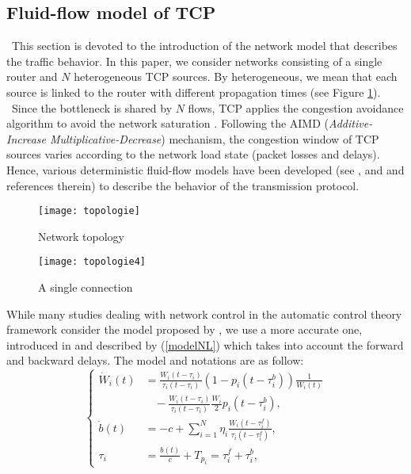 \documentclass[a4paper, 10pt, onecolumn]{article}
\begin{document}
\subsection{Fluid-flow model of TCP}
~\indent  This section is devoted to the introduction of the network model that describes the traffic behavior. In this paper, we consider networks consisting of a single router and $N$ heterogeneous TCP sources. By heterogeneous, we mean that each source is linked to the router with different propagation times (see Figure \ref{topologie}).\\
~\indent Since the bottleneck is shared by $N$ flows, TCP applies the congestion avoidance algorithm to avoid the network saturation \cite{Jac88}. Following the AIMD ({\it Additive-Increase Multiplicative-Decrease}) mechanism, the congestion window of TCP sources varies according to the network load state (packet losses and delays). Hence, various deterministic fluid-flow models have been developed (see \cite{Low02}, \cite{Mis00} and \cite{Sri04} and references therein) to describe the behavior of the transmission protocol.
\begin{figure}
\centerline{\texttt{[image: topologie]}}
       \caption{Network topology}
       \label{topologie}
       \end{figure}
\begin{figure}
        \centerline{\texttt{[image: topologie4]}}
       \caption{A single connection}
       \label{topologie4}
\end{figure}
While many studies dealing with network control in the automatic control theory framework consider the model proposed by \cite{Mis00}, we use a more accurate one, introduced in \cite{Low02} and described by  (\ref{modelNL}) which takes into account the forward and backward delays. The model and notations are as follow:
\begin{equation}
  \label{modelNL}
\left\{\begin{array}{rl}
\dot{W}_i(t)&=\frac{W_i(t-\tau_i)}{\tau_i(t-\tau_i)}(1-p_i(t-\tau_i^b))\frac{1}{W_i(t)}\\&~~~~-\frac{W_i(t-\tau_i)}{\tau_i(t-\tau_i)}\frac{W_i}{2}p_i(t-\tau_i^b),\\
\dot{b}(t)&=-c+\sum_{i=1}^N\eta_i\frac{W_i(t-\tau_i^f)}{\tau_i(t-\tau_i^f)},\\
\tau_i&=\frac{b(t)}{c}+T_{p_i}=\tau_i^f+\tau_i^b,
\end{array} \right.
\end{equation}
\end{document}
